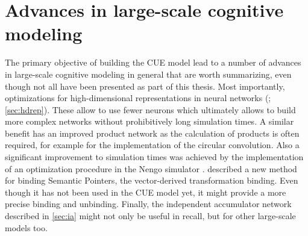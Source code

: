 \section{Advances in large-scale cognitive modeling}
The primary objective of building the CUE model lead to a number of advances in large-scale cognitive modeling in general that are worth summarizing, even though not all have been presented as part of this thesis.
Most importantly, optimizations for high-dimensional representations in neural networks (\cite{gosmann216}; \cref{sec:hdrep}).
These allow to use fewer neurons which ultimately allows to build more complex networks without prohibitively long simulation times.
A similar benefit has an improved product network \parencite{gosmann2015-1} as the calculation of products is often required, for example for the implementation of the circular convolution.
Also a significant improvement to simulation times was achieved by the implementation of an optimization procedure in the Nengo simulator \parencite{gosmann2017}.
 described a new method for binding Semantic Pointers, the vector-derived transformation binding.
Even though it has not been used in the CUE model yet, it might provide a more precise binding and unbinding.
Finally, the independent accumulator network described in \cref{sec:ia} might not only be useful in recall, but for other large-scale models too.

